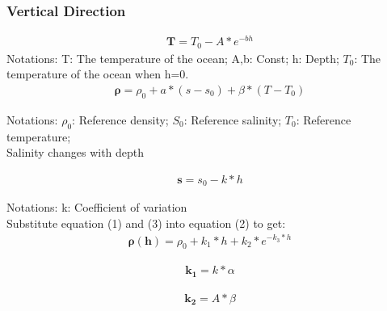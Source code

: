 \documentclass[12pt]{article}  %
\begin{document}
\subsubsection{Vertical Direction}
\begin{equation}
    \begin{aligned}
     \mathbf{T}=T_0-A*e^{-bh}
\end{aligned}
\end{equation}
\indent Notations: T: The temperature of the ocean; A,b: Const; h: Depth; 
$T_0$: The temperature of the ocean when h=0.\\

\begin{equation}
    \begin{aligned}
     \mathbf{\rho}=\rho_0+a*(s-s_0)+\beta*(T-T_0)
\end{aligned}
\end{equation}

\indent Notations: $\rho_0$: Reference density; $S_0$: Reference salinity; $T_0$: Reference temperature; \\

\indent Salinity changes with depth

\begin{equation}
    \begin{aligned}
     \mathbf{s}=s_0-k*h
\end{aligned}
\end{equation}

\indent Notations: k: Coefficient of variation\\

Substitute equation (1) and (3) into equation (2) to get:
\begin{equation}
    \begin{aligned}
        \mathbf{\rho(h)}=\rho_0+k_1*h+k_2*e^{-k_3*h}
\end{aligned}
\end{equation}

\begin{equation}
    \begin{aligned}
        \mathbf{k_1}=k*\alpha
\end{aligned}
\end{equation}

\begin{equation}
    \begin{aligned}
\mathbf{k_2}=A*\beta
\end{aligned}
\end{equation}
\end{document}
